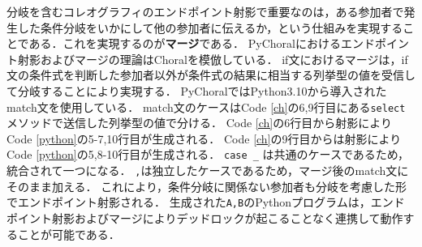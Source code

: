 \documentclass{resume}
\begin{document}
分岐を含むコレオグラフィのエンドポイント射影で重要なのは，ある参加者で発生した条件分岐をいかにして他の参加者に伝えるか，という仕組みを実現することである．これを実現するのが\textbf{マージ}である．
PyChoralにおけるエンドポイント射影およびマージの理論はChoralを模倣している．
if文におけるマージは，if文の条件式を判断した参加者以外が条件式の結果に相当する列挙型の値を受信して分岐することにより実現する．
PyChoralではPython3.10から導入されたmatch文を使用している．
match文のケースはCode \ref{ch}の6,9行目にある\texttt{select}メソッドで送信した列挙型の値で分ける．
Code \ref{ch}の6行目から射影によりCode \ref{python}の5-7,10行目が生成される．
Code \ref{ch}の9行目からは射影によりCode \ref{python}の5,8-10行目が生成される．
\texttt{case \_} は共通のケースであるため，統合されて一つになる．
\texttt{{\color{red}{OddEven.EVEN}},{\color{blue}{OddEven.ODD}}}は独立したケースであるため，マージ後のmatch文にそのまま加える．
これにより，条件分岐に関係ない参加者も分岐を考慮した形でエンドポイント射影される．
生成された\texttt{A,B}のPythonプログラムは，エンドポイント射影およびマージによりデッドロックが起こることなく連携して動作することが可能である．

\end{document}
